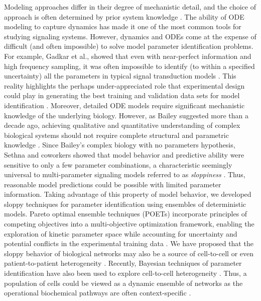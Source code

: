 \documentclass[12pt]{article}
\begin{document}
Modeling approaches differ in their degree of mechanistic detail, and the choice of approach is often determined by prior system knowledge \citep{2012_kholodenko_kolch_SciSig}. 
The ability of ODE modeling to capture dynamics has made it one of the most common tools for studying signaling systems. 
However, dynamics and ODEs come at the expense of difficult (and often impossible) to solve model parameter identification problems. 
For example, Gadkar et al., showed that even with near-perfect information and high frequency sampling, 
it was often impossible to identify (to within a specified uncertainty) all the parameters in typical signal transduction models \citep{Gadkar:2005ad}. 
This reality highlights the perhaps under-appreciated role that experimental design could play in generating the best training and validation data sets for model identification \citep{Apgar:2010fk}.
Moreover, detailed ODE models require significant mechanistic knowledge of the underlying biology. 
However, as Bailey suggested more than a decade ago, achieving qualitative and quantitative understanding of complex biological systems should not require complete structural and parametric knowledge \citep{2001_bailey_NatBiotech}. 
Since Bailey's complex biology with no parameters hypothesis, Sethna and coworkers showed that model behavior and predictive ability were sensitive to only a few parameter combinations, a characteristic seemingly universal to multi-parameter signaling models referred to as \textit{sloppiness} \citep{Machta:2013aa}.
Thus, reasonable model predictions could be possible with limited parameter information. 
Taking advantage of this property of model behavior, we developed sloppy techniques for parameter identification using ensembles of deterministic models. 
Pareto optimal ensemble techniques (POETs) incorporate principles of competing objectives into a multi-objective optimization framework, enabling the exploration of kinetic parameter space while accounting for uncertainty and potential conflicts in the experimental training data \citep{2010_song_varner_BiotechJ}. 
We have proposed that the sloppy behavior of biological networks may also be a source of cell-to-cell \citep{2011_lequieu_chakrabarti_nayak_varner_PLoSCompBio} or even patient-to-patient heterogeneity \citep{2010_luan_varner_MolBioSys}. 
Recently, Bayesian techniques of parameter identification have also been used to explore cell-to-cell heterogeneity  \citep{2011_kalita_brasier_JBC,2011_hasenauer_allgower_BMCBioinfo}. 
Thus, a population of cells could be viewed as a dynamic ensemble of networks as the operational biochemical pathways are often context-specific \citep{2012_creixell_linding_NatBiotech}. 
\end{document}
